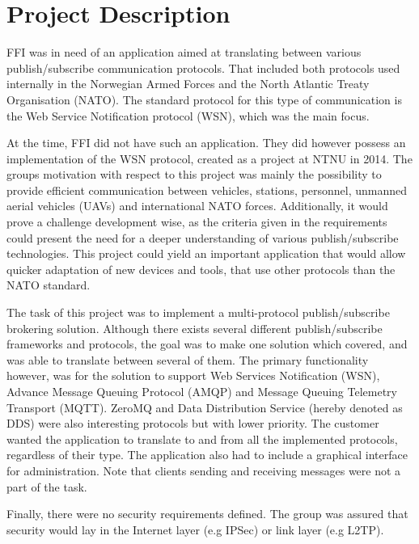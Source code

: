 \section{Project Description}
\label{sec:introduction-project_description}

FFI was in need of an application aimed at translating between various publish/subscribe communication protocols. That included both protocols used internally in the Norwegian Armed Forces and the North Atlantic Treaty Organisation (NATO). The standard protocol for this type of communication is the Web Service Notification protocol (WSN), which was the main focus.

At the time, FFI did not have such an application. They did however possess an implementation of the WSN protocol, created as a project at NTNU in 2014. The groups motivation with respect to this project was mainly the possibility to provide efficient communication between vehicles, stations, personnel, unmanned aerial vehicles (UAVs) and international NATO forces. Additionally, it would prove a challenge development wise, as the criteria given in the requirements could present the need for a  deeper understanding of various publish/subscribe technologies. This project could yield an important application that would allow quicker adaptation of new devices and tools, that use other protocols than the NATO standard.

The task of this project was to implement a multi-protocol publish/subscribe brokering solution. Although there exists several different publish/subscribe frameworks and protocols, the goal was to make one solution which covered, and was able to translate between several of them. The primary functionality however, was for the solution to support Web Services Notification (WSN), Advance Message Queuing Protocol (AMQP) and Message Queuing Telemetry Transport (MQTT). ZeroMQ and Data Distribution Service (hereby denoted as DDS) were also interesting protocols but with lower priority. The customer wanted the application to translate to and from all the implemented protocols, regardless of their type. The application also had to include a graphical interface for administration. Note that clients sending and receiving messages were not a part of the task.

Finally, there were no security requirements defined. The group was assured that security would lay in the Internet layer (e.g IPSec) or link layer (e.g L2TP).


\clearpage